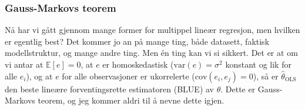\subsubsection{Gauss-Markovs teorem}
Nå har vi gått gjennom mange former for multippel lineær regresjon, men hvilken er egentlig best? Det kommer jo an på mange ting, både datasett, faktisk modellstruktur, og mange andre ting. Men én ting kan vi si sikkert. Det er at om vi antar at $\mathbb{E}[e] = 0$, at $e$ er homoskedastisk ($\textrm{var}(e) = \sigma^2$ konstant og lik for alle $e_i$), og at $e$ for alle observasjoner er ukorrelerte ($\textrm{cov}(e_i, e_j) = 0$), så er $\hat{\theta}_\textrm{OLS}$ den beste lineære forventingsrette estimatoren (BLUE) av $\theta$. Dette er Gauss-Markovs teorem, og jeg kommer aldri til å nevne dette igjen.
